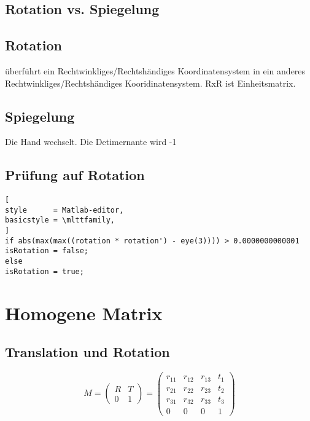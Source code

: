 \subsection{Rotation vs. Spiegelung}

	\subsection{Rotation}
 		überführt ein Rechtwinkliges/Rechtshändiges Koordinatensystem in ein anderes Rechtwinkliges/Rechtshändiges Kooridinatensystem. RxR ist Einheitsmatrix.
 	\subsection{Spiegelung}
		Die Hand wechselt. Die Detimernante wird -1

\subsection{Prüfung auf Rotation}

\begin{lstlisting}[
style      = Matlab-editor,
basicstyle = \mlttfamily,
]
if abs(max(max((rotation * rotation') - eye(3)))) > 0.0000000000001
isRotation = false;
else
isRotation = true;

\end{lstlisting}


\section{Homogene Matrix}
\label{chp:MathematischeGrundlagen:sec:HomogeneMatrix}

\subsection{Translation und Rotation}
\begin{equation}
	M = 
	\left(
	\begin{array}{cc}
		R & T\\
		0 & 1
	\end{array}
	\right)
	=
	\left(
	\begin{array}{cccc}
		r_{11} & r_{12} & r_{13} & t_{1} \\
		r_{21} & r_{22} & r_{23} & t_{2} \\
		r_{31} & r_{32} & r_{33} & t_{3} \\
		0 	   & 0    & 0    & 1  
	\end{array}
	\right)	
\end{equation}

